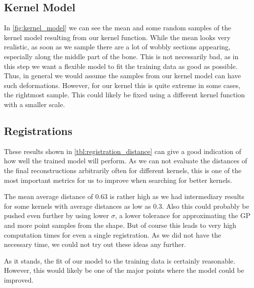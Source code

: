 
\subsection{Kernel Model}
\label{subsec:kernmodeldisc}

In \autoref{fig:kernel_model} we can see the mean and some random samples of the kernel model resulting from our kernel function. 
While the mean looks very realistic, as soon as we sample there are a lot of wobbly sections appearing, especially along the middle part of the bone. 
This is not necessarily bad, as in this step we want a flexible model to fit the training data as good as possible.
Thus, in general we would assume the samples from our kernel model can have such deformations.
However, for our kernel this is quite extreme in some cases, \eg the rightmost sample.
This could likely be fixed using a different kernel function with a smaller scale.


\subsection{Registrations}
\label{subsec:registrresultsdisc}
These results shown in \autoref{tbl:registration_distance} can give a good indication of how well the trained model will perform.
As we can not evaluate the distances of the final reconstructions arbitrarily often for different kernels, this is one of the most important metrics for us to improve when searching for better kernels.

The mean average distance of $0.63$ is rather high as we had intermediary results for some kernels with average distances as low as $0.3$. 
Also this could probably be pushed even further by using lower $\sigma$, a lower tolerance for approximating the GP and more point samples from the shape. 
But of course this leads to very high computation times for even a single registration.
As we did not have the necessary time, we could not try out these ideas any further.

As it stands, the fit of our model to the training data is certainly reasonable.
However, this would likely be one of the major points where the model could be improved.


